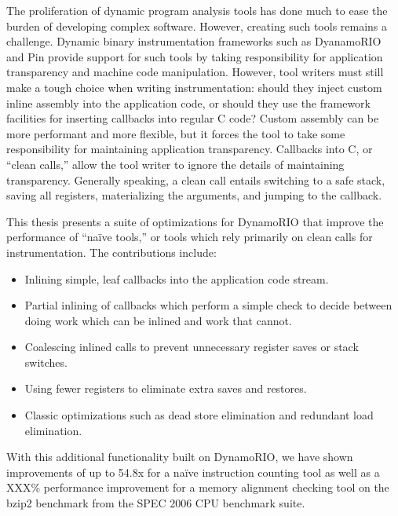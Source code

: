 \begin{abstractpage}

The proliferation of dynamic program analysis tools has done much to ease the
burden of developing complex software.  However, creating such tools remains a
challenge.  Dynamic binary instrumentation frameworks such as DyanamoRIO and
Pin provide support for such tools by taking responsibility for application
transparency and machine code manipulation.  However, tool writers must still
make a tough choice when writing instrumentation: should they inject custom
inline assembly into the application code, or should they use the framework
facilities for inserting callbacks into regular C code?  Custom assembly can be
more performant and more flexible, but it forces the tool to take some
responsibility for maintaining application transparency.  Callbacks into C, or
``clean calls,'' allow the tool writer to ignore the details of maintaining
transparency.  Generally speaking, a clean call entails switching to a safe
stack, saving all registers, materializing the arguments, and jumping to the
callback.


This thesis presents a suite of optimizations for DynamoRIO that improve the
performance of ``na\"ive tools,'' or tools which rely primarily on clean calls
for instrumentation.  The contributions include:

\begin{itemize}
\item Inlining simple, leaf callbacks into the application code stream.
\item Partial inlining of callbacks which perform a simple check to decide
between doing work which can be inlined and work that cannot.
\item Coalescing inlined calls to prevent unnecessary register saves or stack
switches.
\item Using fewer registers to eliminate extra saves and restores.
\item Classic optimizations such as dead store elimination and redundant load
elimination.
\end{itemize}

With this additional functionality built on DynamoRIO, we have shown
improvements of up to 54.8x for a na\"ive instruction counting tool as well as
a XXX\% performance improvement for a memory alignment checking tool on the
bzip2 benchmark from the SPEC 2006 CPU benchmark suite.

\end{abstractpage}
